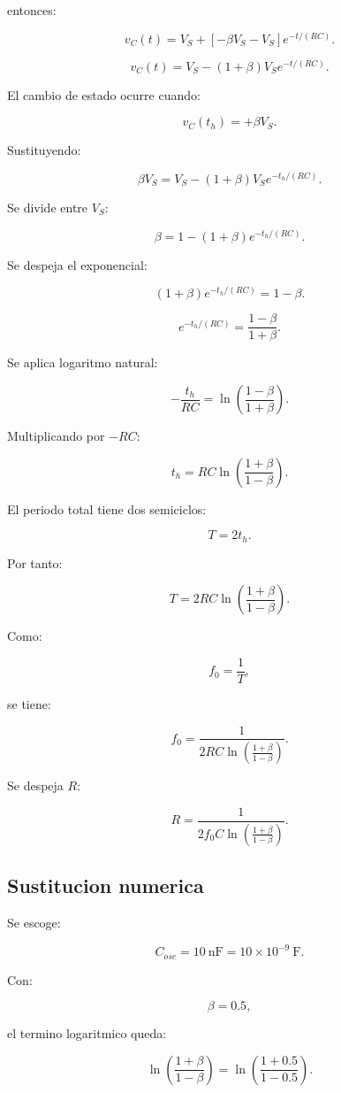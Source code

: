 \documentclass[11pt,letterpaper]{article}
\begin{document}
entonces:

\[
v_C(t)=V_S+\left[-\beta V_S-V_S\right]e^{-t/(RC)}.
\]

\[
v_C(t)=V_S-(1+\beta)V_S e^{-t/(RC)}.
\]

El cambio de estado ocurre cuando:

\[
v_C(t_h)=+\beta V_S.
\]

Sustituyendo:

\[
\beta V_S=V_S-(1+\beta)V_S e^{-t_h/(RC)}.
\]

Se divide entre \(V_S\):

\[
\beta=1-(1+\beta)e^{-t_h/(RC)}.
\]

Se despeja el exponencial:

\[
(1+\beta)e^{-t_h/(RC)}=1-\beta.
\]

\[
e^{-t_h/(RC)}=\frac{1-\beta}{1+\beta}.
\]

Se aplica logaritmo natural:

\[
-\frac{t_h}{RC}=
\ln\left(\frac{1-\beta}{1+\beta}\right).
\]

Multiplicando por \(-RC\):

\[
t_h=RC\ln\left(\frac{1+\beta}{1-\beta}\right).
\]

El periodo total tiene dos semiciclos:

\[
T=2t_h.
\]

Por tanto:

\[
T=2RC\ln\left(\frac{1+\beta}{1-\beta}\right).
\]

Como:

\[
f_0=\frac{1}{T},
\]

se tiene:

\[
f_0=
\frac{1}
{2RC\ln\left(\frac{1+\beta}{1-\beta}\right)}.
\]

Se despeja \(R\):

\[
R=
\frac{1}
{2f_0C\ln\left(\frac{1+\beta}{1-\beta}\right)}.
\]

\subsection{Sustitucion numerica}

Se escoge:

\[
C_{osc}=10~\text{nF}=10\times 10^{-9}~\text{F}.
\]

Con:

\[
\beta=0.5,
\]

el termino logaritmico queda:

\[
\ln\left(\frac{1+\beta}{1-\beta}\right)
=
\ln\left(\frac{1+0.5}{1-0.5}\right).
\]
\end{document}
